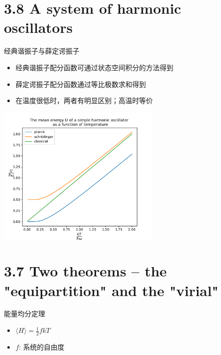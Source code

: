 \documentclass{ctexbeamer}
\begin{document}
\section{3.8 A system of harmonic oscillators}
\begin{frame}{经典谐振子与薛定谔振子}
    \begin{itemize}
        \item 经典谐振子配分函数可通过状态空间积分的方法得到
        \item 薛定谔振子配分函数通过等比极数求和得到
        \item 在温度很低时，两者有明显区别；高温时等价
    \end{itemize}
    \begin{center}
    \includegraphics[width=0.6\textwidth]{oscillator_energy.pdf}
    \end{center}
\end{frame}

\section{3.7 Two theorems -- the "equipartition" and the "virial"}
\begin{frame}{能量均分定理}
\begin{itemize}
    \item $\langle H \rangle = \frac{1}{2} fkT$
    \item $f$: 系统的自由度
\end{itemize}
\end{frame}
\end{document}
